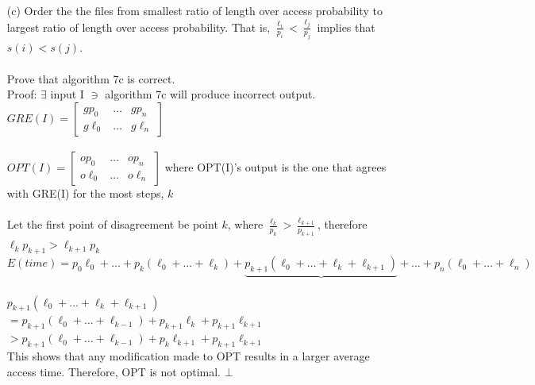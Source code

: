 \documentclass[10pt]{article}
\begin{document}
\begin{enumerate}
		\item[(c)] Order the the files from smallest ratio of length over access probability to largest ratio of length
		over access probability. That is, $\frac{\ell_{i}}{p_{i}} < \frac{\ell_{j}}{p_{j}}$ implies that $s(i) < s(j)$.
		\\
		\\
		Prove that algorithm 7c is correct. 
		\\
		Proof: $\exists$ input I $\ni$ algorithm 7c will produce incorrect output.\\
		$GRE(I) = \left[
		\begin{array}{ccc}
		gp_{0} & \ldots & gp_{n}\\ 
		g\ell_{0} & \ldots & g\ell_{n}
		\end{array}
	 \right]$ 
	 \\
	 \\
		$OPT(I) = \left[
		\begin{array}{ccc}
		op_{0} & \ldots & op_{n}\\ 
		o\ell_{0} & \ldots & o\ell_{n}
		\end{array}
	 \right]$ where OPT(I)'s output is the one that agrees with GRE(I) for the most steps, $k$\\
	 \\
	 Let the first point of disagreement be point $k$, where $\frac{\ell_{k}}{p_{k}} > \frac{\ell_{k+1}}{p_{k+1}}$, therefore $\ell_{k} p_{k+1} > \ell_{k+1} p_{k}$\\
	 
	 $E(time) = p_{0}\ell_{0} + \ldots + p_{k}(\ell_{0}+\ldots+\ell_{k}) + \underbrace{p_{k+1}(\ell_{0}+\ldots+\ell_{k}+\ell_{k+1})}{} + \ldots + p_{n}(\ell_{0}+\ldots+\ell_{n})$\\
	 \\
	 $p_{k+1}(\ell_{0}+\ldots+\ell_{k}+\ell_{k+1})$\\
	 $= p_{k+1}(\ell_{0}+\ldots+\ell_{k-1}) + p_{k+1}\ell_{k}+p_{k+1}\ell_{k+1}$\\
	 $> p_{k+1}(\ell_{0}+\ldots+\ell_{k-1}) + p_{k}\ell_{k+1}+p_{k+1}\ell_{k+1}$
	 \\
	 This shows that any modification made to OPT results in a larger average access time. Therefore, OPT is not optimal. $\bot$
	 
	\end{enumerate}
\end{document}
